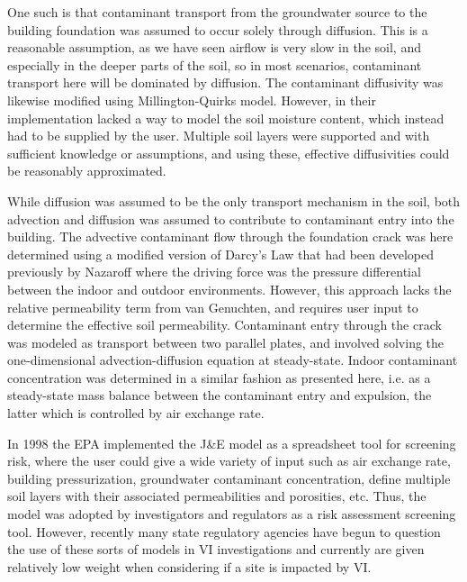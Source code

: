 One such is that contaminant transport from the groundwater source to the building foundation was assumed to occur solely through diffusion.
This is a reasonable assumption, as we have seen airflow is very slow in the soil, and especially in the deeper parts of the soil, so in most scenarios, contaminant transport here will be dominated by diffusion.
The contaminant diffusivity was likewise modified using Millington-Quirks model.
However, in their implementation lacked a way to model the soil moisture content, which instead had to be supplied by the user.
Multiple soil layers were supported and with sufficient knowledge or assumptions, and using these, effective diffusivities could be reasonably approximated.\par

While diffusion was assumed to be the only transport mechanism in the soil, both advection and diffusion was assumed to contribute to contaminant entry into the building.
The advective contaminant flow through the foundation crack was here determined using a modified version of Darcy's Law that had been developed previously by Nazaroff\cite{nazaroff_radon_1985} where the driving force was the pressure differential between the indoor and outdoor environments.
However, this approach lacks the relative permeability term from van Genuchten, and requires user input to determine the effective soil permeability.
Contaminant entry through the crack was modeled as transport between two parallel plates, and involved solving the one-dimensional advection-diffusion equation at steady-state.
Indoor contaminant concentration was determined in a similar fashion as presented here, i.e. as a steady-state mass balance between the contaminant entry and expulsion, the latter which is controlled by air exchange rate.\par

In 1998 the EPA implemented the J\&E model as a spreadsheet tool for screening risk, where the user could give a wide variety of input such as air exchange rate, building pressurization, groundwater contaminant concentration, define multiple soil layers with their associated permeabilities and porosities, etc.
Thus, the model was adopted by investigators and regulators as a risk assessment screening tool\cite{u.s._environmental_protection_agency_oswer_2015}.
However, recently many state regulatory agencies have begun to question the use of these sorts of models in VI investigations and currently are given relatively low weight when considering if a site is impacted by VI.\par


